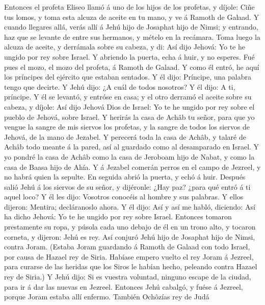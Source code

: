  Entonces el profeta Eliseo llamó á uno de los hijos de los
profetas, y díjole: Ciñe tus lomos, y toma esta alcuza de aceite en tu
mano, y ve á Ramoth de Galaad.  Y cuando llegares allá,
verás allí á Jehú hijo de Josaphat hijo de Nimsi; y entrando, haz que se
levante de entre sus hermanos, y mételo en la recámara. 
Toma luego la alcuza de aceite, y derrámala sobre su cabeza, y di: Así
dijo Jehová: Yo te he ungido por rey sobre Israel. Y abriendo la puerta,
echa á huir, y no esperes.  Fué pues el mozo, el mozo del
profeta, á Ramoth de Galaad.  Y como él entró, he aquí los
príncipes del ejército que estaban sentados. Y él dijo: Príncipe, una
palabra tengo que decirte. Y Jehú dijo: ¿A cuál de todos nosotros? Y él
dijo: A ti, príncipe.  Y él se levantó, y entróse en casa; y
el otro derramó el aceite sobre su cabeza, y díjole: Así dijo Jehová
Dios de Israel: Yo te he ungido por rey sobre el pueblo de Jehová, sobre
Israel.  Y herirás la casa de Achâb tu señor, para que yo
vengue la sangre de mis siervos los profetas, y la sangre de todos los
siervos de Jehová, de la mano de Jezabel.  Y perecerá toda
la casa de Achâb, y talaré de Achâb todo meante á la pared, así al
guardado como al desamparado en Israel.  Y yo pondré la casa
de Achâb como la casa de Jeroboam hijo de Nabat, y como la casa de Baasa
hijo de Ahía.  Y á Jezabel comerán perros en el campo de
Jezreel, y no habrá quien la sepulte. En seguida abrió la puerta, y echó
á huir.  Después salió Jehú á los siervos de su señor, y
dijéronle: ¿Hay paz? ¿para qué entró á ti aquel loco? Y él les dijo:
Vosotros conocéis al hombre y sus palabras.  Y ellos
dijeron: Mentira; decláranoslo ahora. Y él dijo: Así y así me habló,
diciendo: Así ha dicho Jehová: Yo te he ungido por rey sobre Israel.
 Entonces tomaron prestamente su ropa, y púsola cada uno
debajo de él en un trono alto, y tocaron corneta, y dijeron: Jehú es
rey.  Así conjuró Jehú hijo de Josaphat hijo de Nimsi,
contra Joram. (Estaba Joram guardando á Ramoth de Galaad con todo
Israel, por causa de Hazael rey de Siria.  Habíase empero
vuelto el rey Joram á Jezreel, para curarse de las heridas que los Siros
le habían hecho, peleando contra Hazael rey de Siria.) Y Jehú dijo: Si
es vuestra voluntad, ninguno escape de la ciudad, para ir á dar las
nuevas en Jezreel.  Entonces Jehú cabalgó, y fuése á
Jezreel, porque Joram estaba allí enfermo. También Ochôzías rey de Judá
